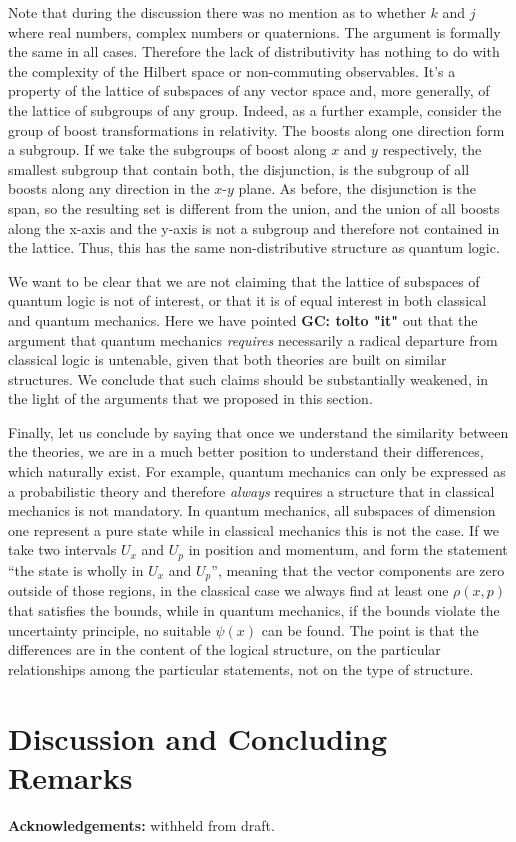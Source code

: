 \documentclass[11pt, executivepaper]{article}
\begin{document}
Note that during the discussion there was no mention as to whether $k$ and $j$ where real numbers, complex numbers or quaternions. The argument is formally the same in all cases. Therefore the lack of distributivity has nothing to do with the complexity of the Hilbert space or non-commuting observables. It's a property of the lattice of subspaces of any vector space and, more generally, of the lattice of subgroups of any group. Indeed, as a further example, consider the group of boost transformations in relativity. The boosts along one direction form a subgroup. If we take the subgroups of boost along $x$ and $y$ respectively, the smallest subgroup that contain both, the disjunction, is the subgroup of all boosts along any direction in the $x$-$y$ plane. As before, the disjunction is the span, so the resulting set is different from the union, and the union of all boosts along the x-axis and the y-axis is not a subgroup and therefore not contained in the lattice. Thus, this has the same non-distributive structure as quantum logic.

We want to be clear that we are not claiming that the lattice of subspaces of quantum logic is not of interest, or that it is of equal interest in both classical and quantum mechanics. Here we have pointed \textbf{GC: tolto "it" } out that the argument that quantum mechanics \emph{requires} necessarily a radical departure from classical logic is untenable, given that both theories are built on similar structures. We conclude that such claims should be substantially weakened, in the light of the arguments that we proposed in this section. 

Finally, let us conclude by saying that once we understand the similarity between the theories, we are in a much better position to understand their differences, which naturally exist. For example, quantum mechanics can only be expressed as a probabilistic theory and therefore \emph{always} requires a structure that in classical mechanics is not mandatory. In quantum mechanics, all subspaces of dimension one represent a pure state while in classical mechanics this is not the case. If we take two intervals $U_x$ and $U_p$ in position and momentum, and form the statement ``the state is wholly in $U_x$ and $U_p$'', meaning that the vector components are zero outside of those regions, in the classical case we always find at least one $\rho(x,p)$ that satisfies the bounds, while in quantum mechanics, if the bounds violate the uncertainty principle, no suitable $\psi(x)$ can be found. The point is that the differences are in the content of the logical structure, on the particular relationships among the particular statements, not on the type of structure.

\section{Discussion and Concluding Remarks}
\label{conc}
\vspace{5mm}

\textbf{Acknowledgements:} withheld from draft.
\clearpage



\end{document}
